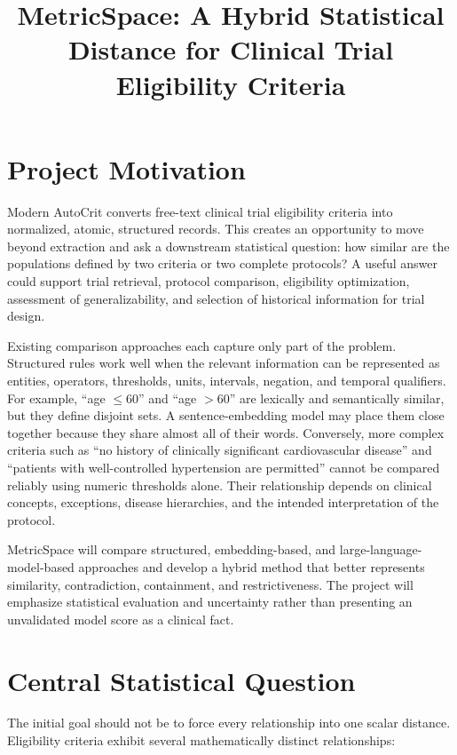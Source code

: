 \documentclass[11pt]{article}
\title{MetricSpace: A Hybrid Statistical Distance for Clinical Trial Eligibility Criteria}
\author{}
\date{}
\begin{document}
\maketitle
\tableofcontents

\newpage
\section{Project Motivation}

Modern AutoCrit converts free-text clinical trial eligibility criteria into normalized, atomic, structured records. This creates an opportunity to move beyond extraction and ask a downstream statistical question: how similar are the populations defined by two criteria or two complete protocols? A useful answer could support trial retrieval, protocol comparison, eligibility optimization, assessment of generalizability, and selection of historical information for trial design.

Existing comparison approaches each capture only part of the problem. Structured rules work well when the relevant information can be represented as entities, operators, thresholds, units, intervals, negation, and temporal qualifiers. For example, ``age $\leq 60$'' and ``age $>60$'' are lexically and semantically similar, but they define disjoint sets. A sentence-embedding model may place them close together because they share almost all of their words. Conversely, more complex criteria such as ``no history of clinically significant cardiovascular disease'' and ``patients with well-controlled hypertension are permitted'' cannot be compared reliably using numeric thresholds alone. Their relationship depends on clinical concepts, exceptions, disease hierarchies, and the intended interpretation of the protocol.

MetricSpace will compare structured, embedding-based, and large-language-model-based approaches and develop a hybrid method that better represents similarity, contradiction, containment, and restrictiveness. The project will emphasize statistical evaluation and uncertainty rather than presenting an unvalidated model score as a clinical fact.

\section{Central Statistical Question}

The initial goal should not be to force every relationship into one scalar distance. Eligibility criteria exhibit several mathematically distinct relationships:
\end{document}
